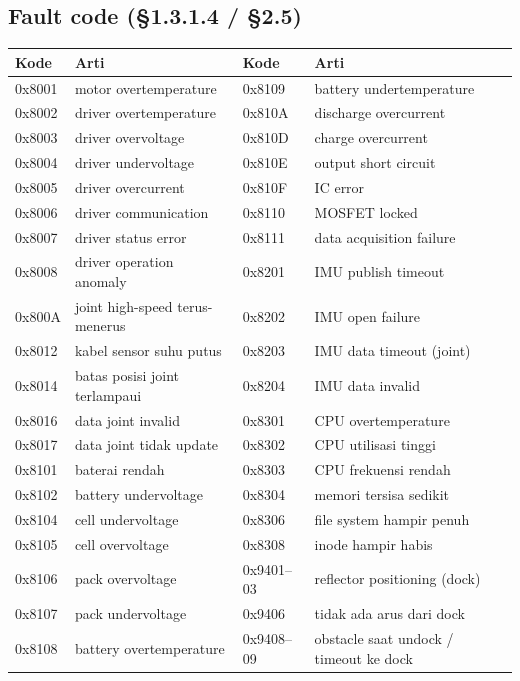 \documentclass[11pt,a4paper]{article}
\begin{document}
\subsection{Fault code (\S1.3.1.4 / \S2.5)}
\begin{xltabular}{\linewidth}{@{}L{18mm}YL{18mm}Y@{}}
\toprule
\textbf{Kode} & \textbf{Arti} & \textbf{Kode} & \textbf{Arti}\\\midrule
\endhead
0x8001 & motor overtemperature & 0x8109 & battery undertemperature\\
0x8002 & driver overtemperature & 0x810A & discharge overcurrent\\
0x8003 & driver overvoltage & 0x810D & charge overcurrent\\
0x8004 & driver undervoltage & 0x810E & output short circuit\\
0x8005 & driver overcurrent & 0x810F & IC error\\
0x8006 & driver communication & 0x8110 & MOSFET locked\\
0x8007 & driver status error & 0x8111 & data acquisition failure\\
0x8008 & driver operation anomaly & 0x8201 & IMU publish timeout\\
0x800A & joint high-speed terus-menerus & 0x8202 & IMU open failure\\
0x8012 & kabel sensor suhu putus & 0x8203 & IMU data timeout (joint)\\
0x8014 & batas posisi joint terlampaui & 0x8204 & IMU data invalid\\
0x8016 & data joint invalid & 0x8301 & CPU overtemperature\\
0x8017 & data joint tidak update & 0x8302 & CPU utilisasi tinggi\\
0x8101 & baterai rendah & 0x8303 & CPU frekuensi rendah\\
0x8102 & battery undervoltage & 0x8304 & memori tersisa sedikit\\
0x8104 & cell undervoltage & 0x8306 & file system hampir penuh\\
0x8105 & cell overvoltage & 0x8308 & inode hampir habis\\
0x8106 & pack overvoltage & 0x9401--03 & reflector positioning (dock)\\
0x8107 & pack undervoltage & 0x9406 & tidak ada arus dari dock\\
0x8108 & battery overtemperature & 0x9408--09 & obstacle saat undock / timeout ke dock\\
\bottomrule
\end{xltabular}
\end{document}
